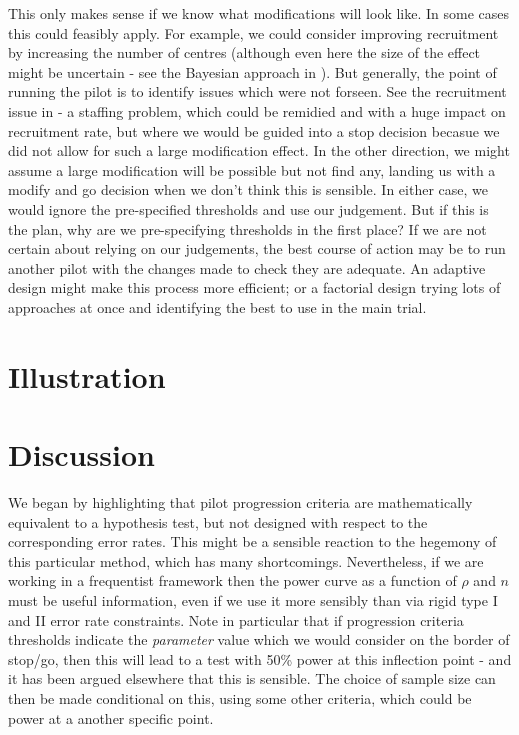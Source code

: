 \documentclass[sagev, Crown]{sagej} %
\begin{document}
This only makes sense if we know what modifications will look like. In some cases this could feasibly apply. For example, we could consider improving recruitment by increasing the number of centres (although even here the size of the effect might be uncertain - see the Bayesian approach in \cite{Hampson2017}). But generally, the point of running the pilot is to identify issues which were not forseen. See the recruitment issue in \cite{Avery2017} - a staffing problem, which could be remidied and with a huge impact on recruitment rate, but where we would be guided into a stop decision becasue we did not allow for such a large modification effect. In the other direction, we might assume a large modification will be possible but not find any, landing us with a modify and go decision when we don't think this is sensible. In either case, we would ignore the pre-specified thresholds and use our judgement. But if this is the plan, why are we pre-specifying thresholds in the first place? If we are not certain about relying on our judgements, the best course of action may be to run another pilot with the changes made to check they are adequate. An adaptive design might make this process more efficient; or a factorial design trying lots of approaches at once and identifying the best to use in the main trial.

\section{Illustration}

\section{Discussion}

We began by highlighting that pilot progression criteria are mathematically equivalent to a hypothesis test, but not designed with respect to the corresponding error rates. This might be a sensible reaction to the hegemony of this particular method, which has many shortcomings. Nevertheless, if we are working in a frequentist framework then the power curve as a function of $\rho$ and $n$ must be useful information, even if we use it more sensibly than via rigid type I and II error rate constraints. Note in particular that if progression criteria thresholds indicate the \emph{parameter} value which we would consider on the border of stop/go, then this will lead to a test with 50\% power at this inflection point - and it has been argued elsewhere that this is sensible. The choice of sample size can then be made conditional on this, using some other criteria, which could be power at a another specific point.
\end{document}
